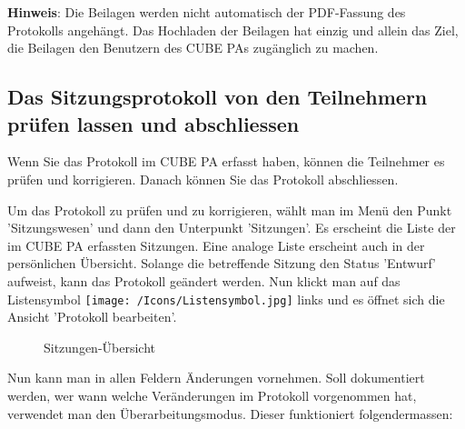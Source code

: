 \vspace{\baselineskip}

\textbf{Hinweis}: Die Beilagen werden nicht automatisch der PDF-Fassung des Protokolls angehängt. Das Hochladen der Beilagen hat einzig und allein das Ziel, die Beilagen den Benutzern des CUBE PAs zugänglich zu machen.

\subsection{Das Sitzungsprotokoll von den Teilnehmern prüfen lassen und abschliessen}
\label{bkm:Ref434478117}
Wenn Sie das Protokoll im CUBE PA erfasst haben, können die Teilnehmer es prüfen und korrigieren. Danach können Sie das Protokoll abschliessen.

\vspace{\baselineskip}

Um das Protokoll zu prüfen und zu korrigieren, wählt man im Menü den Punkt 'Sitzungswesen' und dann den Unterpunkt 'Sitzungen'. Es erscheint die Liste der im CUBE PA erfassten Sitzungen. Eine analoge Liste erscheint auch in der persönlichen Übersicht. Solange die betreffende Sitzung den Status 'Entwurf' aufweist, kann das Protokoll geändert werden. Nun klickt man auf das Listensymbol \texttt{[image: /Icons/Listensymbol.jpg]}  links und es öffnet sich die Ansicht 'Protokoll bearbeiten'.

\begin{figure}[H]
\caption{Sitzungen-Übersicht}
\end{figure}

\vspace{\baselineskip}

Nun kann man in allen Feldern Änderungen vornehmen. Soll dokumentiert werden, wer wann welche Veränderungen im Protokoll vorgenommen hat, verwendet man den Überarbeitungsmodus. Dieser funktioniert folgendermassen:

\vspace{\baselineskip}

